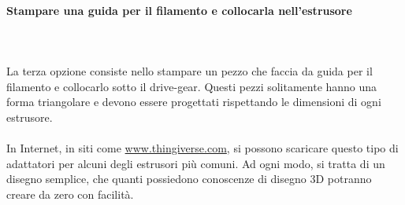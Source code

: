 \documentclass[11pt,a4paper]{article}
\begin{document}
			\paragraph{Stampare una guida per il filamento e collocarla nell'estrusore }\mbox{}\\\\
La terza opzione consiste nello stampare un pezzo che faccia da guida per il filamento e collocarlo sotto il drive-gear. Questi pezzi solitamente hanno una forma triangolare e devono essere progettati rispettando le dimensioni di ogni estrusore. 
\\\\
In Internet, in siti come \url{www.thingiverse.com}, si possono scaricare questo tipo di adattatori per alcuni degli estrusori più comuni. Ad ogni modo, si tratta di un disegno semplice, che quanti possiedono conoscenze di disegno 3D potranno creare da zero con facilità.
\end{document}
